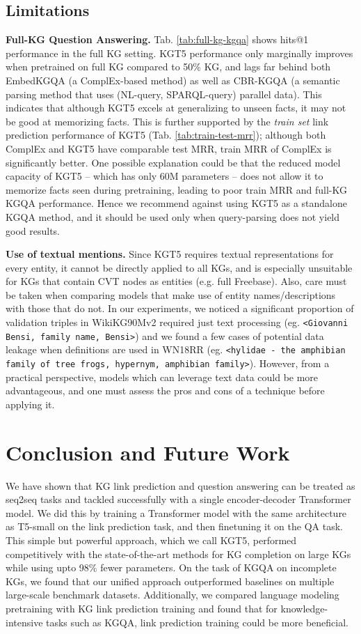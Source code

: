 \documentclass[11pt]{article}
\renewcommand\:{\colon} \newcommand{\sset}[1]{\left\{\,#1\,\right\}} \newcommand{\ssets}[1]{\left\{#1\right\}} \newcommand{\ssetn}[1]{\{\,#1\,\}}
\newcommand{\method}{\textsc{KGT5}}
\begin{document}
\subsection{Limitations}
\label{sec:limitations}
\noindent\textbf{Full-KG Question Answering.} Tab. \ref{tab:full-kg-kgqa} shows hits@1 performance in the full KG setting. \method{} performance only marginally improves when pretrained on full KG compared to 50\% KG, and lags far behind both EmbedKGQA (a ComplEx-based method) as well as CBR-KGQA (a semantic parsing method that uses (NL-query, SPARQL-query) parallel data). This indicates that although \method{} excels at generalizing to unseen facts, it may not be good at memorizing facts. This is further supported by the \textit{train set} link prediction performance of \method{} (Tab. \ref{tab:train-test-mrr}); although both ComplEx and \method{} have comparable test MRR, train MRR of ComplEx is significantly better. One possible explanation could be that the reduced model capacity of \method{} -- which has only 60M parameters -- does not allow it to memorize facts seen during pretraining, leading to poor train MRR and full-KG KGQA performance. Hence we recommend against using \method{} as a standalone KGQA method, and it should be used only when query-parsing does not yield good results. 


\noindent\textbf{Use of textual mentions.}
Since \method{} requires textual representations for every entity, it cannot be directly applied to all KGs, and is especially unsuitable for KGs that contain CVT nodes as entities (e.g. full Freebase). Also, care must be taken when comparing models that make use of entity names/descriptions with those that do not. In our experiments, we noticed a significant proportion of validation triples in WikiKG90Mv2 required just text processing (eg. \texttt{<Giovanni Bensi, family name, Bensi>}) and we found a few cases of potential data leakage when definitions are used in WN18RR (eg. \texttt{<hylidae - the amphibian family of tree frogs, hypernym, amphibian family>}). However, from a practical perspective, models which can leverage text data could be more advantageous, and one must assess the pros and cons of a technique before applying it. 


\section{Conclusion and Future Work}
We have shown that KG link prediction and question answering can be treated as seq2seq tasks and tackled successfully with a single encoder-decoder Transformer model. 
We did this by training a Transformer model with the same architecture as T5-small on the link prediction task, and then finetuning it on the QA task. This simple but powerful approach, which we call \method{},
performed competitively with the state-of-the-art methods for KG completion on large KGs while using upto 98\% fewer parameters.
On the task of KGQA on incomplete KGs, we found that our unified approach outperformed baselines on multiple large-scale benchmark datasets. 
Additionally, we compared language modeling pretraining with KG link prediction training and found that for knowledge-intensive tasks such as KGQA, link prediction training could be more beneficial.
\end{document}
